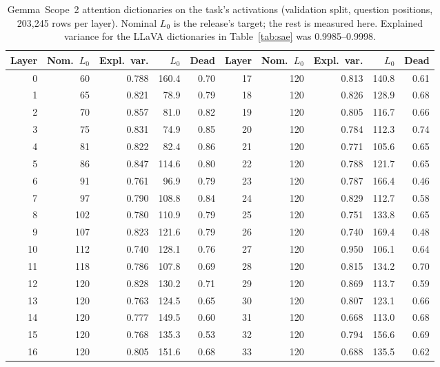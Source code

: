 \documentclass[11pt,a4paper]{article}
\begin{document}
\begin{table}[h]
  \centering
  \caption{Gemma~Scope~2 attention dictionaries on the task's activations
  (validation split, question positions, 203{,}245 rows per layer). Nominal
  $L_0$ is the release's target; the rest is measured here. Explained variance
  for the LLaVA dictionaries in Table~\ref{tab:sae} was 0.9985--0.9998.}
  \label{tab:gemma-sae}
  \small
  \begin{tabular}{rrrrr@{\hskip 1.5em}rrrrr}
    \toprule
    Layer & Nom.\ $L_0$ & Expl.\ var. & $L_0$ & Dead & Layer & Nom.\ $L_0$ & Expl.\ var. & $L_0$ & Dead \\
    \midrule
     0 &  60 & 0.788 & 160.4 & 0.70 & 17 & 120 & 0.813 & 140.8 & 0.61 \\
     1 &  65 & 0.821 &  78.9 & 0.79 & 18 & 120 & 0.826 & 128.9 & 0.68 \\
     2 &  70 & 0.857 &  81.0 & 0.82 & 19 & 120 & 0.805 & 116.7 & 0.66 \\
     3 &  75 & 0.831 &  74.9 & 0.85 & 20 & 120 & 0.784 & 112.3 & 0.74 \\
     4 &  81 & 0.822 &  82.4 & 0.86 & 21 & 120 & 0.771 & 105.6 & 0.65 \\
     5 &  86 & 0.847 & 114.6 & 0.80 & 22 & 120 & 0.788 & 121.7 & 0.65 \\
     6 &  91 & 0.761 &  96.9 & 0.79 & 23 & 120 & 0.787 & 166.4 & 0.46 \\
     7 &  97 & 0.790 & 108.8 & 0.84 & 24 & 120 & 0.829 & 112.7 & 0.58 \\
     8 & 102 & 0.780 & 110.9 & 0.79 & 25 & 120 & 0.751 & 133.8 & 0.65 \\
     9 & 107 & 0.823 & 121.6 & 0.79 & 26 & 120 & 0.740 & 169.4 & 0.48 \\
    10 & 112 & 0.740 & 128.1 & 0.76 & 27 & 120 & 0.950 & 106.1 & 0.64 \\
    11 & 118 & 0.786 & 107.8 & 0.69 & 28 & 120 & 0.815 & 134.2 & 0.70 \\
    12 & 120 & 0.828 & 130.2 & 0.71 & 29 & 120 & 0.869 & 113.7 & 0.59 \\
    13 & 120 & 0.763 & 124.5 & 0.65 & 30 & 120 & 0.807 & 123.1 & 0.66 \\
    14 & 120 & 0.777 & 149.5 & 0.60 & 31 & 120 & 0.668 & 113.0 & 0.68 \\
    15 & 120 & 0.768 & 135.3 & 0.53 & 32 & 120 & 0.794 & 156.6 & 0.69 \\
    16 & 120 & 0.805 & 151.6 & 0.68 & 33 & 120 & 0.688 & 135.5 & 0.62 \\
    \bottomrule
  \end{tabular}
\end{table}
\end{document}
